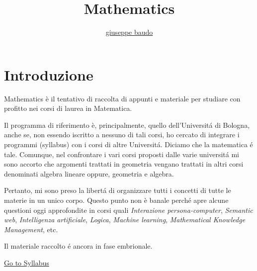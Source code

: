 \documentclass[a4paper,10pt]{article}
\title{Mathematics}
\author{\href{http://www.baudo.hol.es}{giuseppe baudo}}
\begin{document}
	
	\maketitle
	
	\section{Introduzione}		
	Mathematics \`{e} il tentativo di raccolta di appunti e materiale per studiare con profitto nei corsi di laurea in Matematica.
	
	Il programma di riferimento \`{e}, principalmente, quello dell'Universit\'{a}
	di Bologna, anche se, non essendo iscritto a nessuno di tali corsi, ho cercato di integrare i programmi (syllabus) con i corsi di altre Universit\'{a}. Diciamo che la matematica \'{e} tale.
	Comunque, nel confrontare i vari corsi proposti dalle varie universit\'{a} mi sono accorto che argomenti trattati in geometria vengano trattati in altri corsi denominati algebra lineare oppure, geometria e algebra.
	
	Pertanto, mi sono preso la libert\'{a} di organizzare tutti i concetti di tutte le materie in un unico corpo. Questo punto non \`{e} banale perch\'{e} apre alcune questioni oggi
	approfondite in corsi quali \textit{Interazione persona-computer}, \textit{Semantic web}, \textit{Intelligenza artificiale}, \textit{Logica}, \textit{Machine learning}, \textit{Mathematical Knowledge Management}, etc.
	
	Il materiale raccolto \'{e} ancora in fase embrionale. 
	
	
	
	\href{Syllabus.html}{Go to Syllabus}
	
\end{document}
